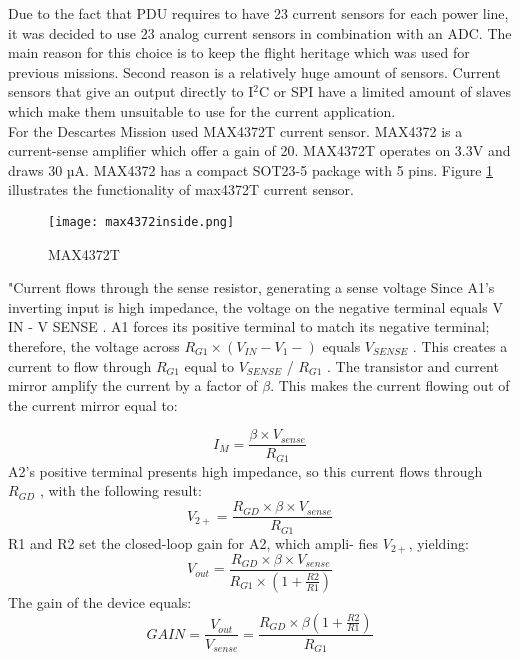 Due to the fact that PDU requires to have 23 current sensors for each power line, it was decided to use 23 analog current sensors in combination with an ADC. The main reason for this choice is to keep the flight heritage which was used for previous missions. Second reason is a relatively huge amount of sensors. Current sensors that give an output directly to I$^2$C or SPI have a limited amount of slaves which make them unsuitable to use for the current application.\\

For the Descartes Mission used MAX4372T current sensor. MAX4372 is a current-sense amplifier which offer a gain of 20. MAX4372T operates on 3.3V and draws 30 µA. MAX4372 has a compact SOT23-5 package with 5 pins. Figure \ref{fig: max4372t_inside} illustrates the functionality of max4372T current sensor.

 \begin{figure}[h]
 	\centering
 	\texttt{[image: max4372inside.png]}
 	\caption{MAX4372T \cite{24}}
 	\label{fig: max4372t_inside}
 \end{figure} 

\cite{23}"Current flows through the sense resistor, generating a
sense voltage  Since
A1’s inverting input is high impedance, the voltage on
the negative terminal equals V IN - V SENSE . A1 forces its
positive terminal to match its negative terminal; therefore,
the voltage across $R_{G1}\times (V_{IN} - V_{1}-)$ equals $V_{SENSE}$ . This
creates a current to flow through $R_{G1}$ equal to $V_{SENSE}$ /
$R_{G1}$ . The transistor and current mirror amplify the current
by a factor of $\beta$. This makes the current flowing out of the
current mirror equal to: 

 \begin{equation}
I_{M} = \frac{\beta \times V_{sense}}{R_{G1}}
 \end{equation}
 A2’s positive terminal presents high impedance, so this
 current flows through $R_{GD}$ , with the following result:
  \begin{equation}
V_{2+} = \frac{R_{GD} \times \beta \times V_{sense}}{R_{G1}}
  \end{equation}
  R1 and R2 set the closed-loop gain for A2, which ampli-
  fies $V_{2+}$, yielding:
  \begin{equation}
  V_{out} = \frac{R_{GD} \times \beta \times V_{sense}}{R_{G1} \times (1+\frac{R2}{R1})	 }
  \end{equation}
The gain of the device equals:
  \begin{equation}
  GAIN =\frac{V_{out}}{V_{sense}} = \frac{R_{GD} \times \beta (1+\frac{R2}{R1})}{R_{G1}}
  \end{equation}
  
